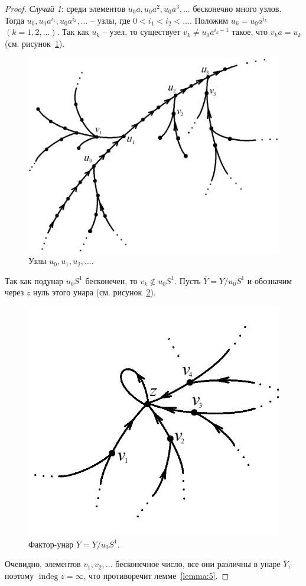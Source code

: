 \documentclass[11pt,twoside,final
]{article}
\def\indeg{\operatorname{indeg}}
\begin{document}
\begin{proof}
	\textit{Случай 1}: среди элементов $u_0 a, u_0 a^2, u_0 a^3, \ldots$ бесконечно много узлов.
	Тогда $u_0, u_0 a^{i_1}, u_0 a^{i_2}, \ldots$ -- узлы, где $0 < i_1 < i_2 < \ldots$.
	Положим $u_k = u_0 a^{i_k}$ $(k=1,2,\ldots)$.
	Так как $u_k$ -- узел, то существует $v_k \neq u_0 a^{i_k - 1}$ такое, что $v_k a = u_k$ (см. рисунок~\ref{fig:uzly_2}).
	\begin{figure}[ht!]
		\centering
		\includegraphics[scale=0.5]{img/uzly_2.png}
		\caption{Узлы $u_0, u_1, u_2, \ldots$.}
		\label{fig:uzly_2}
	\end{figure}
	Так как подунар $u_0 S^1$ бесконечен, то $v_k \notin u_0 S^1$.
	Пусть $\overline{Y} = Y / u_0 S^1$ и обозначим через $z$ нуль этого унара (см. рисунок~\ref{fig:uzly_3}).
	\begin{figure}[ht!]
		\centering
		\includegraphics[scale=0.6]{img/uzly_3.png}
		\caption{Фактор-унар $\overline{Y} = Y / u_0 S^1$.}
		\label{fig:uzly_3}
	\end{figure}
	Очевидно, элементов $v_1, v_2, \ldots$ бесконечное число, все они различны в унаре $\overline{Y}$, поэтому $\indeg z = \infty$, что противоречит лемме~\ref{lemma:5}.


\end{proof}
\end{document}
